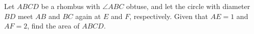 Let $ABCD$ be a rhombus with $\angle ABC$ obtuse, and let the circle with diameter $BD$ meet $AB$ and $BC$ again at $E$ and $F$, respectively. Given that $AE=1$ and $AF=2$, find the area of $ABCD$.
